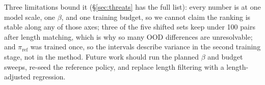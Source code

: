 \documentclass[11pt]{article}
\begin{document}
Three limitations bound it (\S\ref{sec:threats} has the full list): every number is at one model
scale, one $\beta$, and one training budget, so we cannot claim the ranking is stable along any
of those axes; three of the five shifted sets keep under 100 pairs after length matching, which
is why so many OOD differences are unresolvable; and $\pi_{\mathrm{ref}}$ was trained once, so
the intervals describe variance in the second training stage, not in the method. Future work
should run the planned $\beta$ and budget sweeps, re-seed the reference policy, and replace
length filtering with a length-adjusted regression.



\end{document}
